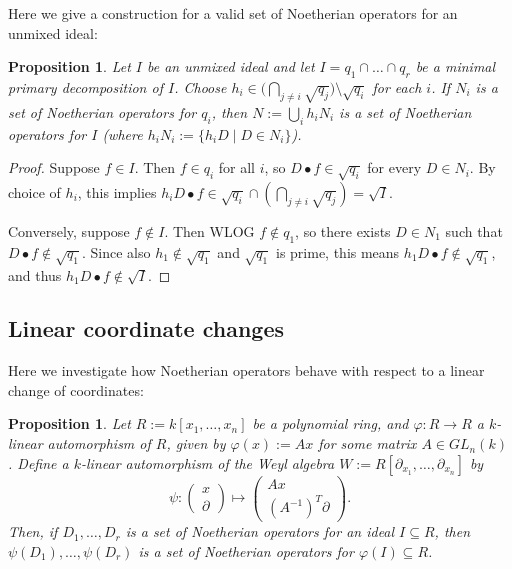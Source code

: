 \documentclass[letterpaper]{article}
\theoremstyle{plain}
\newtheorem{proposition}[theorem]{Proposition}
\theoremstyle{definition}
\theoremstyle{remark}
\begin{document}
Here we give a construction for a valid set of Noetherian operators for an unmixed ideal:
\begin{proposition}
Let $I$ be an unmixed ideal and let $I = q_1 \cap \ldots \cap q_r$ be a minimal primary decomposition of $I$. Choose $\displaystyle h_i \in \Big( \bigcap_{j \ne i} \sqrt{q_j} \Big) \setminus \sqrt{q_i}$ for each $i$. If $N_i$ is a set of Noetherian operators for $q_i$, then $N := \bigcup_i h_iN_i$ is a set of Noetherian operators for $I$ (where $h_i N_i := \{ h_i D \mid D \in N_i \}$).
\end{proposition}

\begin{proof}
Suppose $f \in I$. Then $f \in q_i$ for all $i$, so $D \bullet f \in \sqrt{q_i}$ for every $D \in N_i$. By choice of $h_i$, this implies $h_i D \bullet f \in \sqrt{q_i} \cap \left( \bigcap_{j \ne i} \sqrt{q_j} \right) = \sqrt{I}$.

Conversely, suppose $f \not \in I$. Then WLOG $f \not \in q_1$, so there exists $D \in N_1$ such that $D \bullet f \not \in \sqrt{q_1}$. Since also $h_1 \not \in \sqrt{q_1}$ and $\sqrt{q_1}$ is prime, this means $h_1 D \bullet f \not \in \sqrt{q_1}$, and thus $h_1 D \bullet f \not \in \sqrt{I}$.
\end{proof}

\subsection{Linear coordinate changes}

Here we investigate how Noetherian operators behave with respect to a linear change of coordinates:

\begin{proposition}
Let $R := k[x_1, \ldots, x_n]$ be a polynomial ring, and $\varphi : R \to R$ a $k$-linear automorphism of $R$, given by $\varphi(x) := Ax$ for some matrix $A \in GL_n(k)$. Define a $k$-linear automorphism of the Weyl algebra $W := R[\partial_{x_1}, \ldots, \partial_{x_n}]$ by 
\[
\psi : \begin{pmatrix}
x \\
\partial 
\end{pmatrix} \mapsto 
\begin{pmatrix}
Ax \\
(A^{-1})^T \partial 
\end{pmatrix}.
\]
Then, if $D_1, \ldots, D_r$ is a set of Noetherian operators for an ideal $I \subseteq R$, then $\psi(D_1), \ldots, \psi(D_r)$ is a set of Noetherian operators for $\varphi(I) \subseteq R$.
\end{proposition}
\end{document}
